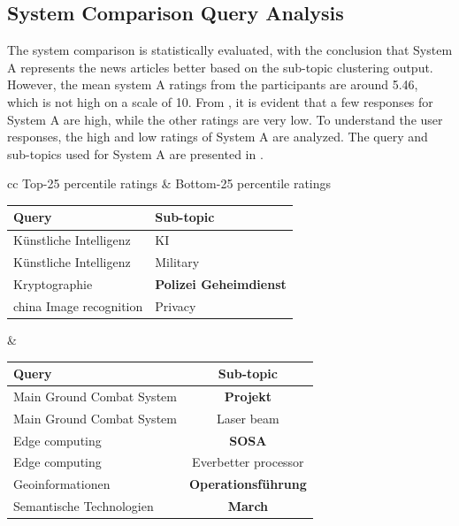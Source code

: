 \subsection{System Comparison Query Analysis}

The system comparison is statistically evaluated, with the conclusion that System A represents the news articles better based on the sub-topic clustering output. However, the mean system A ratings from the participants are around 5.46, which is not high on a scale of 10. From , it is evident that a few responses for System A are high, while the other ratings are very low. To understand the user responses, the high and low ratings of System A are analyzed. The query and sub-topics used for System A are presented in .

\begin{center}
	\label{tab:queries_question_234}
	\begin{tabular}{ cc }   %
		Top-25 percentile ratings & Bottom-25 percentile ratings \\  
		\begin{tabularx}{.4\textwidth}{|Y|Y|}
			\hline
			Query  & Sub-topic \\
			\hline
			Künstliche Intelligenz & KI  \\
			\hline
			Künstliche Intelligenz & Military \\
			\hline
			Kryptographie & \textbf{Polizei Geheimdienst}\\
			\hline
			china Image recognition & Privacy \\
			\hline
		\end{tabularx}&  %
		\begin{tabularx}{.55\textwidth}{|Y|c|}
			\hline
			Query  & Sub-topic \\
			\hline
			Main Ground Combat System & \textbf{Projekt}  \\
			\hline
			Main Ground Combat System & Laser beam \\
			\hline
			Edge computing & \textbf{SOSA} \\
			\hline
			Edge computing & Everbetter processor \\
			\hline
			Geoinformationen & \textbf{Operationsführung} \\
			\hline
			Semantische Technologien & \textbf{March} \\
			\hline
		\end{tabularx}\\
	\end{tabular}
\end{center}

